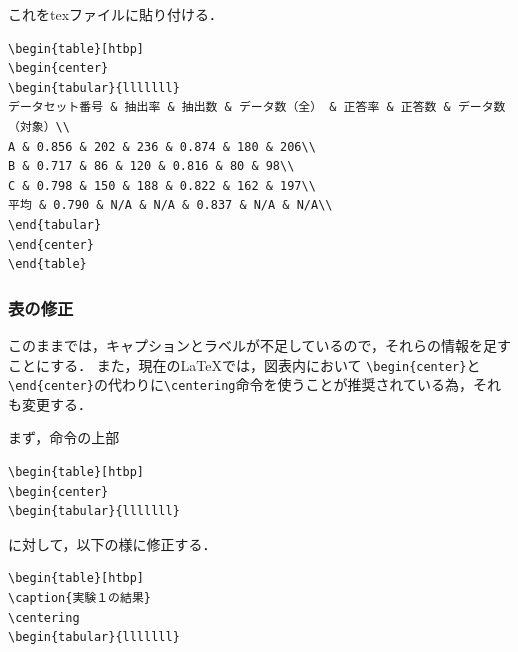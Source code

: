 これをtexファイルに貼り付ける．
\begin{breakbox}
{\small
\begin{verbatim}
\begin{table}[htbp]
\begin{center}
\begin{tabular}{lllllll}
データセット番号 & 抽出率 & 抽出数 & データ数（全） & 正答率 & 正答数 & データ数（対象）\\
A & 0.856 & 202 & 236 & 0.874 & 180 & 206\\
B & 0.717 & 86 & 120 & 0.816 & 80 & 98\\
C & 0.798 & 150 & 188 & 0.822 & 162 & 197\\
平均 & 0.790 & N/A & N/A & 0.837 & N/A & N/A\\
\end{tabular}
\end{center}
\end{table}
\end{verbatim}
}
\end{breakbox}

\subsubsection{表の修正}
このままでは，キャプションとラベルが不足しているので，それらの情報を足すことにする．
また，現在の\LaTeX では，図表内において \verb+\begin{center}+と\verb+\end{center}+の代わりに\verb+\centering+命令を使うことが推奨されている為，それも変更する．

まず，命令の上部
\begin{breakbox}
{\small
\begin{verbatim}
\begin{table}[htbp]
\begin{center}
\begin{tabular}{lllllll}
\end{verbatim}
}
\end{breakbox}
に対して，以下の様に修正する．
\begin{breakbox}
{\small
\begin{verbatim}
\begin{table}[htbp]
\caption{実験１の結果}
\centering
\begin{tabular}{lllllll}
\end{verbatim}
}
\end{breakbox}

